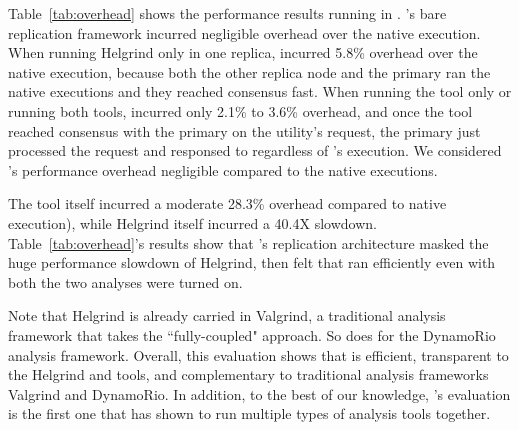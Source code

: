 Table~\ref{tab:overhead} shows the performance results running \clamav in 
\xxx. \xxx's bare replication framework incurred negligible overhead over 
the native execution. When running Helgrind only in one 
replica, \xxx incurred 5.8\% overhead over the native execution, because both 
the other replica node and the primary ran the native executions and they 
reached consensus fast. When running the \drcov tool only or running both 
tools, \xxx incurred only 2.1\% to 3.6\% overhead, and once the \drcov tool 
reached consensus with the primary on the \clamdscan utility's request, the 
primary just processed the request and responsed to \clamdscan regardless of 
\drcov's execution. We considered \xxx's performance overhead negligible 
compared to the native executions.

The \drcov tool itself incurred a moderate 28.3\% overhead compared to native 
execution), while Helgrind itself incurred a 40.4X slowdown. 
Table~\ref{tab:overhead}'s results show that \xxx's replication architecture 
masked the huge performance slowdown of Helgrind, then \clamdscan felt that 
\clamav ran efficiently even with both the two analyses were turned on.

Note that Helgrind is already carried in Valgrind, a traditional analysis 
framework that takes the ``fully-coupled" approach. So does \drcov for the 
DynamoRio analysis framework. Overall, this evaluation shows that \xxx is 
efficient, transparent to the 
Helgrind and \drcov tools, and complementary to traditional analysis frameworks 
Valgrind and DynamoRio. In addition, to the best of our knowledge, \xxx's 
evaluation is the first one that has shown to run multiple types of analysis 
tools together.
